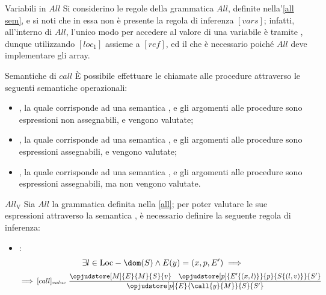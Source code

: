 \documentclass[a4paper, 12pt]{report}
\begin{document}
    \begin{framedobs}{Variabili in $All$}
        Si considerino le regole della grammatica $All$, definite nella'\cref{all sem}, e si noti che in essa non è presente la regola di inferenza $[vars]$; infatti, all'interno di $All$, l'unico modo per accedere al valore di una variabile è tramite , dunque utilizzando $[loc_1]$ assieme a $[ref]$, ed il che è necessario poiché $All$ deve implementare gli array.
    \end{framedobs}

    \begin{frameddefn}{Semantiche di $call$}
        È possibile effettuare le chiamate alle procedure attraverso le seguenti semantiche operazionali:

        \begin{itemize}
            \item {}, la quale corrisponde ad una semantica , e gli argomenti alle procedure sono espressioni non assegnabili, e vengono valutate;
            \item {}, la quale corrisponde ad una semantica , e gli argomenti alle procedure sono espressioni assegnabili, e vengono valutate;
            \item {}, la quale corrisponde ad una semantica , e gli argomenti alle procedure sono espressioni assegnabili, ma non vengono valutate.
        \end{itemize}
    \end{frameddefn}

    \begin{framedprop}[label={all v}]{$All_\mathrm{V}$}
        Sia $All$ la grammatica definita nella \cref{all}; per poter valutare le sue espressioni attraverso la semantica , è necessario definire la seguente regola di inferenza:

        \begin{itemize}
            \item {}: $$\exists l \in \mathrm{Loc} - \dom(S) \land E(y) = (x, p, E') \implies$$ $$\implies [call]_{value} \ \dfrac{\opjudstore[M]{E}{M}{S}{v} \quad \opjudstore[p]{E'\{(x,l)\}}{p}{S\{(l,v)\}}{S'}}{\opjudstore[p]{E}{\call{y}{M}}{S}{S'}}$$
        \end{itemize}
    \end{framedprop}
\end{document}
